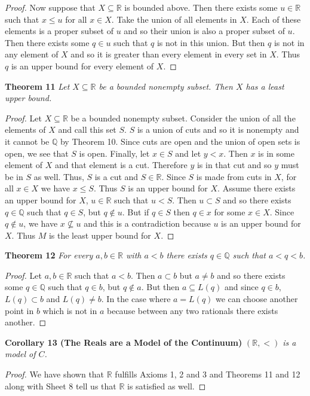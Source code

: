 \documentclass{article}
\begin{document}
\begin{flushleft}
\begin{proof}
Now suppose that $X \subseteq \mathbb{R}$ is bounded above. Then there exists some $u \in \mathbb{R}$ such that $x \leq u$ for all $x \in X$. Take the union of all elements in $X$. Each of these elements is a proper subset of $u$ and so their union is also a proper subset of $u$. Then there exists some $q \in u$ such that $q$ is not in this union. But then $q$ is not in any element of $X$ and so it is greater than every element in every set in $X$. Thus $q$ is an upper bound for every element of $X$.
\end{proof}

\textbf{Theorem 11}
\textsl{Let $X \subseteq \mathbb{R}$ be a bounded nonempty subset. Then $X$ has a least upper bound.}
\begin{proof}
Let $X \subseteq \mathbb{R}$ be a bounded nonempty subset. Consider the union of all the elements of $X$ and call this set $S$. $S$ is a union of cuts and so it is nonempty and it cannot be $\mathbb{Q}$ by Theorem 10. Since cuts are open and the union of open sets is open, we see that $S$ is open. Finally, let $x \in S$ and let $y<x$. Then $x$ is in some element of $X$ and that element is a cut. Therefore $y$ is in that cut and so $y$ must be in $S$ as well. Thus, $S$ is a cut and $S \in \mathbb{R}$. Since $S$ is made from cuts in $X$, for all $x \in X$ we have $x \leq S$. Thus $S$ is an upper bound for $X$. Assume there exists an upper bound for $X$, $u \in \mathbb{R}$ such that $u<S$. Then $u \subset S$ and so there exists $q \in \mathbb{Q}$ such that $q \in S$, but $q \notin u$. But if $q \in S$ then $q \in x$ for some $x \in X$. Since $q \notin u$, we have $x \nsubseteq u$ and this is a contradiction because $u$ is an upper bound for $X$. Thus $M$ is the least upper bound for $X$.
\end{proof}

\textbf{Theorem 12}
\textsl{For every $a, b \in \mathbb{R}$ with $a<b$ there exists $q \in \mathbb{Q}$ such that $a<q<b$.}
\begin{proof}
Let $a,b \in \mathbb{R}$ such that $a<b$. Then $a \subset b$ but $a \neq b$ and so there exists some $q \in \mathbb{Q}$ such that $q \in b$, but $q \notin a$. But then $a \subseteq L(q)$ and since $q \in b$, $L(q) \subset b$ and $L(q) \neq b$. In the case where $a=L(q)$ we can choose another point in $b$ which is not in $a$ because between any two rationals there exists another.
\end{proof}

\textbf{Corollary 13 (The Reals are a Model of the Continuum)}
\textsl{$(\mathbb{R},<)$ is a model of $C$.}
\begin{proof}
We have shown that $\mathbb{R}$ fulfills Axioms 1, 2 and 3 and Theorems 11 and 12 along with Sheet 8 tell us that $\mathbb{R}$ is satisfied as well.
\end{proof}


\end{flushleft}
\end{document}
